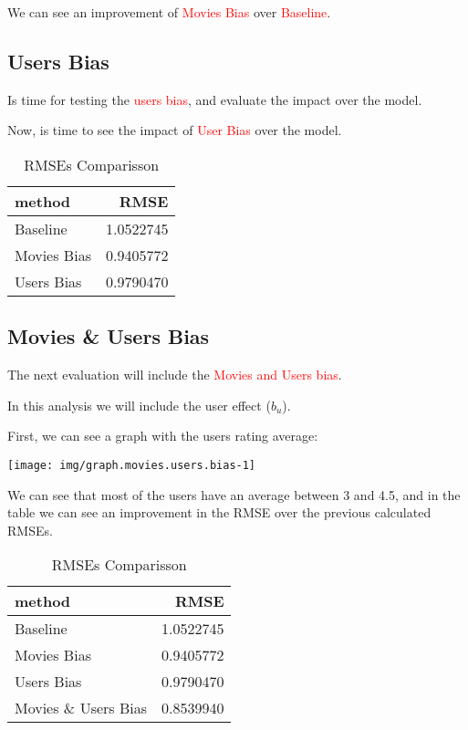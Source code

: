 \documentclass[]{article}
\begin{document}
We can see an improvement of \textcolor{red}{Movies Bias} over
\textcolor{red}{Baseline}.

\hypertarget{users-bias}{%
\subsection{Users Bias}\label{users-bias}}

Is time for testing the \textcolor{red}{users bias}, and evaluate the
impact over the model.

Now, is time to see the impact of \textcolor{red}{User Bias} over the
model.

\begin{table}[!h]

\caption{\label{tab:table.rmse.comparisson.user.bias}RMSEs Comparisson}
\centering
\begin{tabular}{lr}
\toprule
method & RMSE\\
\midrule
\rowcolor{gray!6}  Baseline & 1.0522745\\
Movies Bias & 0.9405772\\
\rowcolor{gray!6}  Users Bias & 0.9790470\\
\bottomrule
\end{tabular}
\end{table}

\hypertarget{movies-users-bias}{%
\subsection{Movies \& Users Bias}\label{movies-users-bias}}

The next evaluation will include the
\textcolor{red}{Movies and Users bias}.

In this analysis we will include the user effect (\(b_{u}\)).

First, we can see a graph with the users rating average:

\begin{center}\texttt{[image: img/graph.movies.users.bias-1]} \end{center}

We can see that most of the users have an average between 3 and 4.5, and
in the table we can see an improvement in the RMSE over the previous
calculated RMSEs.

\begin{table}[!h]

\caption{\label{tab:table.rmse.comparisson}RMSEs Comparisson}
\centering
\begin{tabular}{lr}
\toprule
method & RMSE\\
\midrule
\rowcolor{gray!6}  Baseline & 1.0522745\\
Movies Bias & 0.9405772\\
\rowcolor{gray!6}  Users Bias & 0.9790470\\
Movies \& Users Bias & 0.8539940\\
\bottomrule
\end{tabular}
\end{table}
\end{document}
